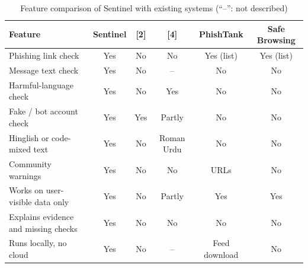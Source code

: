 \begin{table}[H]
\centering
\footnotesize
\renewcommand{\arraystretch}{1.15}
\caption{Feature comparison of Sentinel with existing systems (``--'': not described)}
\label{tab:features}
\begin{tabular}{|>{\raggedright\arraybackslash}p{4.2cm}|c|c|c|c|c|}
\hline
\textbf{Feature} & \textbf{Sentinel} & \textbf{[2]} & \textbf{[4]} & \textbf{PhishTank} & \textbf{Safe Browsing} \\ \hline
Phishing link check & Yes & No & No & Yes (list) & Yes (list) \\ \hline
Message text check & Yes & No & -- & No & No \\ \hline
Harmful-language check & Yes & No & Yes & No & No \\ \hline
Fake / bot account check & Yes & Yes & Partly & No & No \\ \hline
Hinglish or code-mixed text & Yes & No & Roman Urdu & No & No \\ \hline
Community warnings & Yes & No & No & URLs & No \\ \hline
Works on user-visible data only & Yes & No & Partly & Yes & Yes \\ \hline
Explains evidence and missing checks & Yes & No & No & No & No \\ \hline
Runs locally, no cloud & Yes & No & -- & Feed download & No \\ \hline
\end{tabular}
\end{table}
